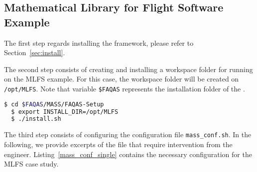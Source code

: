 
\subsection{Mathematical Library for Flight Software Example}
\label{sec:single_machine}

The first step regards installing the \MASS framework, please refer to Section~\ref{sec:install}.

The second step consists of creating and installing a workspace folder for running \MASS on the MLFS example. For this case, the workspace folder will be created on \texttt{/opt/MLFS}. Note that variable \texttt{\$FAQAS} represents the installation folder of the \FAQAS.

\begin{lstlisting}[language=bash]
  $ cd $FAQAS/MASS/FAQAS-Setup
  $ export INSTALL_DIR=/opt/MLFS
  $ ./install.sh
\end{lstlisting}

The third step consists of configuring the \MASS configuration file \texttt{mass\_conf.sh}. In the following, we provide excerpts of the file that require intervention from the engineer. Listing~\ref{mass_conf_single} contains the necessary configuration for the MLFS case study.

